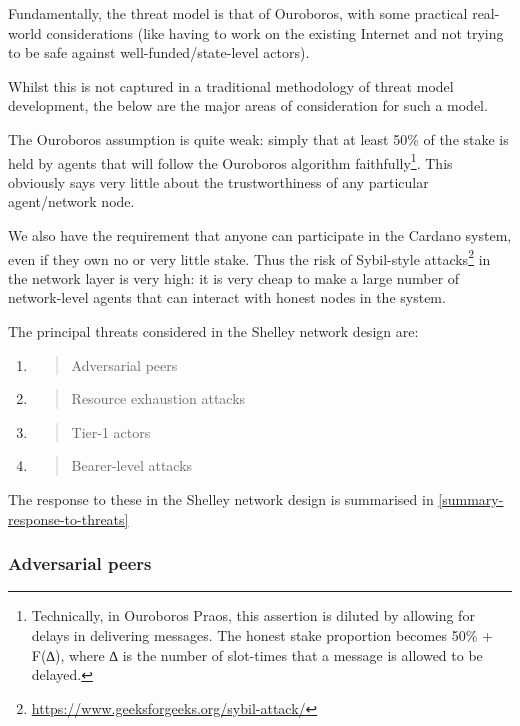 \documentclass[11pt,a4paper]{article}
\begin{document}
Fundamentally, the threat model is that of Ouroboros, with some
practical real-world considerations (like having to work on the existing
Internet and not trying to be safe against well-funded/state-level
actors).

Whilst this is not captured in a traditional methodology of threat model
development, the below are the major areas of consideration for such a
model.

The Ouroboros assumption is quite weak: simply that at least 50\% of the
stake is held by agents that will follow the Ouroboros algorithm
faithfully\footnote{Technically, in Ouroboros Praos, this assertion is
  diluted by allowing for delays in delivering messages. The honest
  stake proportion becomes 50\% + F(∆), where ∆ is the number of
  slot-times that a message is allowed to be delayed.}. This obviously
says very little about the trustworthiness of any particular
agent/network node.

We also have the requirement that anyone can participate in the Cardano
system, even if they own no or very little stake. Thus the risk of
Sybil-style attacks\footnote{\href{https://www.geeksforgeeks.org/sybil-attack/}{{https://www.geeksforgeeks.org/sybil-attack/}}}
in the network layer is very high: it is very cheap to make a large
number of network-level agents that can interact with honest nodes in
the system.

The principal threats considered in the Shelley network design are:

\begin{enumerate}
\def\labelenumi{\arabic{enumi}.}
\item
  \begin{quote}
  Adversarial peers
  \end{quote}
\item
  \begin{quote}
  Resource exhaustion attacks
  \end{quote}
\item
  \begin{quote}
  Tier-1 actors
  \end{quote}
\item
  \begin{quote}
  Bearer-level attacks
  \end{quote}
\end{enumerate}

The response to these in the Shelley network design is summarised in
\cref{summary-response-to-threats}

\subsubsection{Adversarial peers}
\label{adversarial-peers}
\end{document}
